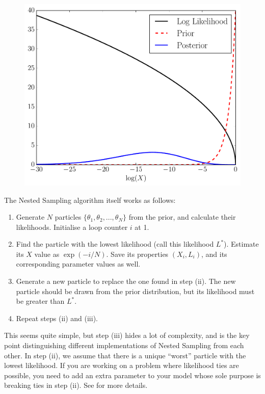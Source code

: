 \begin{figure}
\begin{center}
\includegraphics[scale=0.45]{nested2.pdf}
\caption{\it \label{fig:nested2}}
\end{center}
\end{figure}

The Nested Sampling algorithm itself works as follows:

\begin{enumerate}
\item Generate $N$ particles $\{\theta_1, \theta_2, ..., \theta_N\}$ from
the prior, and calculate their likelihoods. Initialise a loop counter $i$ at
1.
\item Find the particle with the lowest likelihood (call this likelihood $L^*$).
Estimate its $X$ value as
$\exp(-i/N)$. Save its properties $(X_i, L_i)$, and its corresponding
parameter values as well.
\item Generate a new particle to replace the one found in step (ii). The new
particle should be drawn from the prior distribution, but its likelihood
must be greater than $L^*$.
\item Repeat steps (ii) and (iii).
\end{enumerate}

This seems quite simple, but step (iii) hides a lot of complexity, and is the
key point distinguishing different implementations of Nested Sampling from
each other. In step (ii), we assume that there is a unique ``worst'' particle with the
lowest likelihood. If you are working on a problem where likelihood ties are
possible, you need to add an extra parameter to your model whose sole purpose
is breaking ties in step (ii). See \citet{murray} for more details.

